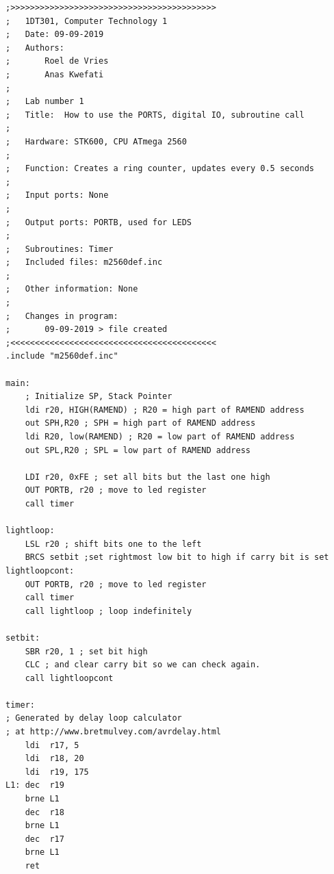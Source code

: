 \documentclass[a4paper,12pt]{article}
\begin{document}
\begin{lstlisting}
;>>>>>>>>>>>>>>>>>>>>>>>>>>>>>>>>>>>>>>>>>>
;	1DT301, Computer Technology 1
;	Date: 09-09-2019
;	Authors:
;		Roel de Vries
;		Anas Kwefati
;
;	Lab number 1
;	Title:	How to use the PORTS, digital IO, subroutine call
;
;	Hardware: STK600, CPU ATmega 2560
;
;	Function: Creates a ring counter, updates every 0.5 seconds
;
;	Input ports: None
;
;	Output ports: PORTB, used for LEDS
;
;	Subroutines: Timer
;	Included files: m2560def.inc
;
;	Other information: None
;
;	Changes in program: 
;		09-09-2019 > file created
;<<<<<<<<<<<<<<<<<<<<<<<<<<<<<<<<<<<<<<<<<<
.include "m2560def.inc"

main:
	; Initialize SP, Stack Pointer
	ldi r20, HIGH(RAMEND) ; R20 = high part of RAMEND address
	out SPH,R20 ; SPH = high part of RAMEND address
	ldi R20, low(RAMEND) ; R20 = low part of RAMEND address
	out SPL,R20 ; SPL = low part of RAMEND address

	LDI r20, 0xFE ; set all bits but the last one high
	OUT PORTB, r20 ; move to led register
	call timer

lightloop:
	LSL r20 ; shift bits one to the left
	BRCS setbit ;set rightmost low bit to high if carry bit is set
lightloopcont:
	OUT PORTB, r20 ; move to led register
	call timer
	call lightloop ; loop indefinitely

setbit:
	SBR r20, 1 ; set bit high
	CLC ; and clear carry bit so we can check again.
	call lightloopcont

timer:
; Generated by delay loop calculator
; at http://www.bretmulvey.com/avrdelay.html
	ldi  r17, 5
    ldi  r18, 20
    ldi  r19, 175
L1: dec  r19
    brne L1
    dec  r18
    brne L1
    dec  r17
    brne L1
	ret

\end{lstlisting}
\end{document}

